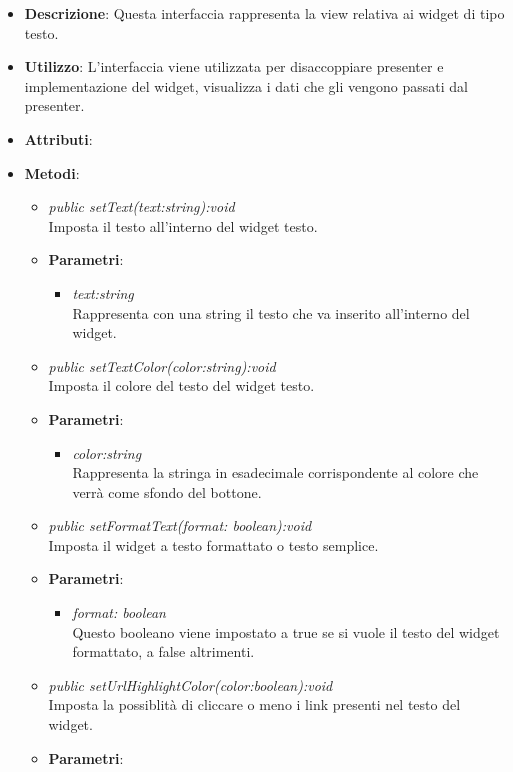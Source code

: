 \begin{itemize}
\item \textbf{Descrizione}: Questa interfaccia rappresenta la view relativa ai widget di tipo testo.
\item \textbf{Utilizzo}: L'interfaccia viene utilizzata per disaccoppiare presenter e implementazione del widget, visualizza i dati che gli vengono passati dal presenter.
\item \textbf{Attributi}:
\item \textbf{Metodi}:
	\begin{itemize}
	\item \textit{public setText(text:string):void}\\
	Imposta il testo all'interno del widget testo.
		\item{\textbf{Parametri}: \begin{itemize}
		\item \textit{text:string}\\
		Rappresenta con una string il testo che va inserito all'interno del widget.
		\end{itemize}}
	\item \textit{public setTextColor(color:string):void}\\
	Imposta il colore del testo del widget testo.
		\item{\textbf{Parametri}: \begin{itemize}
		\item \textit{color:string}\\
		Rappresenta la stringa in esadecimale corrispondente al colore che verrà come sfondo del bottone.
		\end{itemize}}
	\item \textit{public setFormatText(format: boolean):void}\\
	Imposta il widget a testo formattato o testo semplice.
		\item{\textbf{Parametri}: \begin{itemize}
		\item \textit{format: boolean}\\
		Questo booleano viene impostato a true se si vuole il testo del widget formattato, a false altrimenti.
		\end{itemize}}
	\item \textit{public setUrlHighlightColor(color:boolean):void}\\
	Imposta la possiblità di cliccare o meno i link presenti nel testo del widget.
		\item{\textbf{Parametri}: \begin{itemize}

\end{itemize}}
\end{itemize}
\end{itemize}
